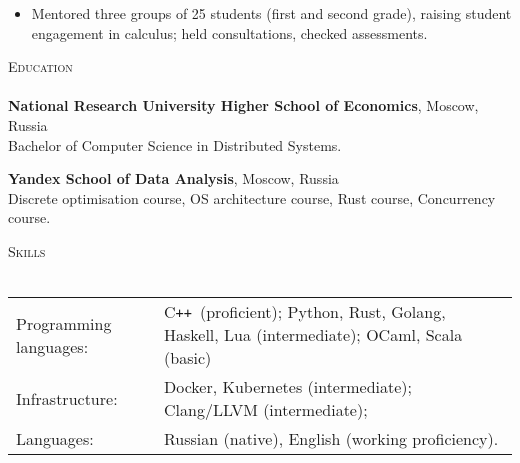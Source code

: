 \documentclass[a4paper]{article}
\newcommand{\lineunder} { \vspace*{-8pt} \\ \hspace*{-18pt} \hrulefill \\ }
\newcommand{\header} [1] { {\hspace*{-18pt}\vspace*{6pt} \textsc{#1}} \vspace*{-6pt} \lineunder }
\newcommand{\CC}{C\texttt{++}}
\begin{document}
\vspace{-1mm}
\begin{itemize} \itemsep 1pt
    \item Mentored three groups of 25 students (first and second grade), raising student engagement
        in calculus; held consultations, checked assessments.
\end{itemize}

\header{Education}

\textbf{National Research University Higher School of Economics}, Moscow, Russia\\
Bachelor of Computer Science in Distributed Systems.

\textbf{Yandex School of Data Analysis}, Moscow, Russia\\
Discrete optimisation course, OS architecture course, Rust course, Concurrency course.

\header{Skills}
\begin{tabular}{@{} l l }
    Programming languages: & \CC \ (proficient); Python, Rust, Golang, Haskell, Lua (intermediate);
    OCaml, Scala (basic)\\
    Infrastructure: & Docker, Kubernetes (intermediate); Clang/LLVM (intermediate); \\
    Languages: & Russian (native), English (working proficiency).\\
\end{tabular}
\end{document}
